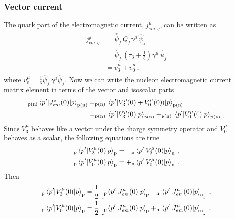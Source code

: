   \subsubsection{Vector current}

    The quark part of the electromagnetic current, $j^{\mu}_{em;q}$, can be
    written as
    \begin{equation}\label{eq:emcurrent30}
      \begin{aligned}
        j^{\mu}_{em;q} &= \bar{\hat{\psi}}_f \, Q_f \gamma^{\mu}\, \hat{\psi}_f \\
                       &= \bar{\hat{\psi}}_f \, (\tau_3 + \frac{1}{6})\gamma^{\mu} \, \hat{\psi}_f \\
                       &= v^{\mu}_3 + v^{\mu}_0 \,,
      \end{aligned}
    \end{equation}
    where $v^{\mu}_0 = \frac{1}{6}\bar{\hat{\psi}}_f \, \gamma^{\mu}
    \hat{\psi}_f$. Now we can write the nucleon electromagnetic current matrix
    element in terms of the vector and isoscalar parts
    \begin{equation}
      \begin{aligned}
        _{\textrm{p(n)}}\mel{p'}{J^{\mu}_{em}(0)}{p}_{\textrm{p(n)}} 
            &= _{\textrm{p(n)}}\mel{p'}{V^{\mu}_3(0) + V^{\mu}_0(0))}{p}_{\textrm{p(n)}} \\
            &= _{\textrm{p(n)}}\mel{p'}{V^{\mu}_3(0)}{p}_{\textrm{p(n)}} 
             + _{\textrm{p(n)}}\mel{p'}{V^{\mu}_0(0)}{p}_{\textrm{p(n)}} \,,
      \end{aligned}
    \end{equation}
    Since $V^{\mu}_3$ behaves like a vector under the charge symmetry operator and
    $V^{\mu}_0$ behaves as a scalar, the following equations are true
    \begin{equation}
      \begin{aligned}
        _{\textrm{p}}\mel{p'}{V^{\mu}_3(0)}{p}_{\textrm{p}} 
          &= - _{\textrm{n}}\mel{p'}{V^{\mu}_3(0)}{p}_{\textrm{n}} \,, \\
        _{\textrm{p}}\mel{p'}{V^{\mu}_0(0)}{p}_{\textrm{p}} 
          &= + _{\textrm{n}}\mel{p'}{V^{\mu}_0(0)}{p}_{\textrm{n}} \,. \\
      \end{aligned}
    \end{equation}
    Then
    \begin{align}\label{eq:V3em}
      _{\textrm{p}}\mel{p'}{V^{\mu}_3(0)}{p}_{\textrm{p}} 
        &= \frac{1}{2} \left[_{\textrm{p}}\mel{p'}{J^{\mu}_{em}(0)}{p}_{\textrm{p}} 
         - _{\textrm{n}}\mel{p'}{J^{\mu}_{em}(0)}{p}_{\textrm{n}} \right] \,, \\
      _{\textrm{p}}\mel{p'}{V^{\mu}_0(0)}{p}_{\textrm{p}} 
        &= \frac{1}{2} \left[_{\textrm{p}}\mel{p'}{J^{\mu}_{em}(0)}{p}_{\textrm{p}} 
         + _{\textrm{n}}\mel{p'}{J^{\mu}_{em}(0)}{p}_{\textrm{n}} \right] \,.
    \end{align}
